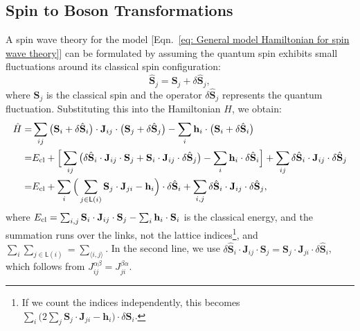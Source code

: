 \subsection{Spin to Boson Transformations}\label{subsec: spin-to-boson transformation}
A spin wave theory for the model [Eqn.~\eqref{eq: General model Hamiltonian for spin wave theory}] can be formulated by assuming the quantum spin exhibits small fluctuations around its classical spin configuration:
\begin{equation}
    \hat{\mathbf{S}}_{j} = \mathbf{S}_{j} + \delta \hat{\mathbf{S}}_{j},
\end{equation}
where $\mathbf{S}_{j}$ is the classical spin and the operator $\delta \hat{\mathbf{S}}_{j}$ represents the quantum fluctuation. Substituting this into the Hamiltonian $H$, we obtain:
\begin{align*}
    \hat{H} 
    = & \sum_{ij} \big( \mathbf{S}_{i} + \delta \hat{\mathbf{S}}_{i} \big) \cdot \mathbf{J}_{ij} \cdot \big( \mathbf{S}_{j} + \delta \hat{\mathbf{S}}_{j} \big) - \sum_{i} \mathbf{h}_{i} \cdot \big( \mathbf{S}_{i} + \delta \hat{\mathbf{S}}_{i} \big) \\
    = & E_{\rm cl}
    + \Big[ \sum_{ij} \big( \delta \hat{\mathbf{S}}_{i} \cdot \mathbf{J}_{ij} \cdot \mathbf{S}_{j} + \mathbf{S}_{i} \cdot \mathbf{J}_{ij} \cdot \delta \hat{\mathbf{S}}_{j} \big) - \sum_{i} \mathbf{h}_{i} \cdot \delta \hat{\mathbf{S}}_{i} \Big] 
    + \sum_{ij} \delta \hat{\mathbf{S}}_{i} \cdot \mathbf{J}_{ij} \cdot \delta \hat{\mathbf{S}}_{j} \\
    = & E_{\rm cl}
    + \sum_{i} \Big( \sum_{j \in \mathsf{L}(i)} \mathbf{S}_{j} \cdot \mathbf{J}_{ji} - \mathbf{h}_{i} \Big) \cdot \delta \hat{\mathbf{S}}_{i}
    + \sum_{i,j} \delta \hat{\mathbf{S}}_{i} \cdot \mathbf{J}_{ij} \cdot \delta \hat{\mathbf{S}}_{j},
\end{align*}
where $E_{\rm cl} = \sum_{i,j} \mathbf{S}_{i} \cdot \mathbf{J}_{ij} \cdot \mathbf{S}_{j} - \sum_{i} \mathbf{h}_{i} \cdot \mathbf{S}_{i}$ is the classical energy, and the summation runs over the links, not the lattice indices\footnote{
    If we count the indices independently, this becomes $\sum_{i} \Big( 2 \sum_{j} \mathbf{S}_{j} \cdot \mathbf{J}_{ji} - \mathbf{h}_{i} \Big) \cdot \delta \hat{\mathbf{S}}_{i}$.
    },
and $\sum_{i} \sum_{j \in \mathsf{L}(i)} = \sum_{\langle i, j \rangle}$.
In the second line, we use $\delta \hat{\mathbf{S}}_{i} \cdot \mathbf{J}_{ij} \cdot \mathbf{S}_{j} = \mathbf{S}_{j} \cdot \mathbf{J}_{ji} \cdot \delta \hat{\mathbf{S}}_{i}$, which follows from $J_{ij}^{\alpha\beta} = J_{ji}^{\beta\alpha}$.



